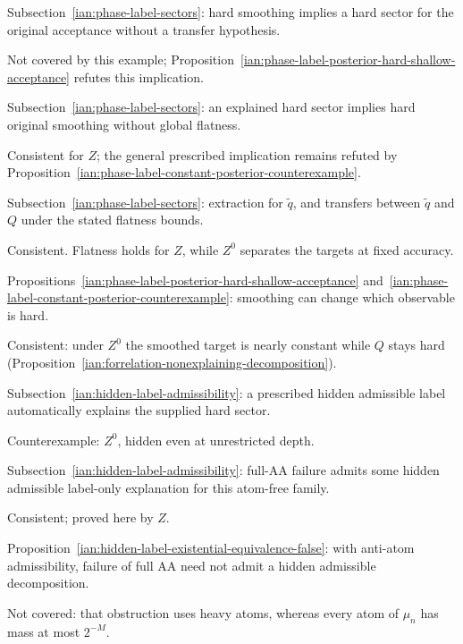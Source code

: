 \begin{remark}
\noindent
\parbox[t]{.70\linewidth}{Subsection~\ref{ian:phase-label-sectors}: hard smoothing implies a hard sector for the original acceptance without a transfer hypothesis.}
\hfill
\parbox[t]{.26\linewidth}{Not covered by this example; Proposition~\ref{ian:phase-label-posterior-hard-shallow-acceptance} refutes this implication.}
\par\smallskip

\noindent
\parbox[t]{.70\linewidth}{Subsection~\ref{ian:phase-label-sectors}: an explained hard sector implies hard original smoothing without global flatness.}
\hfill
\parbox[t]{.26\linewidth}{Consistent for \(Z\); the general prescribed implication remains refuted by Proposition~\ref{ian:phase-label-constant-posterior-counterexample}.}
\par\smallskip

\noindent
\parbox[t]{.70\linewidth}{Subsection~\ref{ian:phase-label-sectors}: extraction for \(\widetilde q\), and transfers between \(\widetilde q\) and \(Q\) under the stated flatness bounds.}
\hfill
\parbox[t]{.26\linewidth}{Consistent. Flatness holds for \(Z\), while \(Z^0\) separates the targets at fixed accuracy.}
\par\smallskip

\noindent
\parbox[t]{.70\linewidth}{Propositions~\ref{ian:phase-label-posterior-hard-shallow-acceptance} and~\ref{ian:phase-label-constant-posterior-counterexample}: smoothing can change which observable is hard.}
\hfill
\parbox[t]{.26\linewidth}{Consistent: under \(Z^0\) the smoothed target is nearly constant while \(Q\) stays hard (Proposition~\ref{ian:forrelation-nonexplaining-decomposition}).}
\par\smallskip

\noindent
\parbox[t]{.70\linewidth}{Subsection~\ref{ian:hidden-label-admissibility}: a prescribed hidden admissible label automatically explains the supplied hard sector.}
\hfill
\parbox[t]{.26\linewidth}{Counterexample: \(Z^0\), hidden even at unrestricted depth.}
\par\smallskip

\noindent
\parbox[t]{.70\linewidth}{Subsection~\ref{ian:hidden-label-admissibility}: full-AA failure admits some hidden admissible label-only explanation for this atom-free family.}
\hfill
\parbox[t]{.26\linewidth}{Consistent; proved here by \(Z\).}
\par\smallskip

\noindent
\parbox[t]{.70\linewidth}{Proposition~\ref{ian:hidden-label-existential-equivalence-false}: with anti-atom admissibility, failure of full AA need not admit a hidden admissible decomposition.}
\hfill
\parbox[t]{.26\linewidth}{Not covered: that obstruction uses heavy atoms, whereas every atom of \(\mu_n\) has mass at most \(2^{-M}\).}
\par\smallskip


\end{remark}
